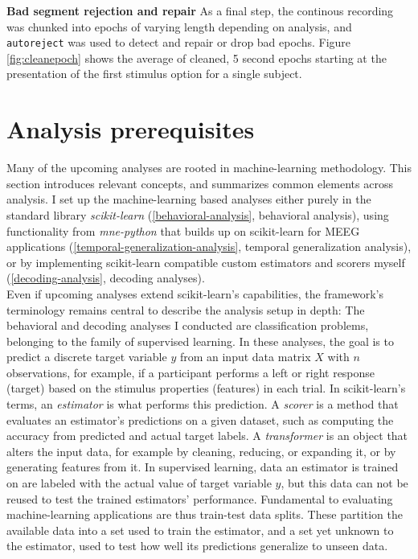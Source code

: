 \textbf{Bad segment rejection and repair} As a final step, the continous recording was chunked into epochs of varying length depending on analysis, and \texttt{autoreject} was used to detect and repair or drop bad epochs.
Figure \ref{fig:cleanepoch} shows the average of cleaned, 5 second epochs starting at the presentation of the first stimulus option for a single subject.



\section{Analysis prerequisites}
\label{decoding}

Many of the upcoming analyses are rooted in machine-learning methodology.
This section introduces relevant concepts, and summarizes common elements across analysis.
I set up the machine-learning based analyses either purely in the standard library \textit{scikit-learn} (\ref{behavioral-analysis}, behavioral analysis), using functionality from \textit{mne-python} that builds up on scikit-learn for MEEG applications (\ref{temporal-generalization-analysis}, temporal generalization analysis), or by implementing scikit-learn compatible custom estimators and scorers myself (\ref{decoding-analysis}, decoding analyses).\\
Even if upcoming analyses extend scikit-learn's capabilities, the framework's terminology remains central to describe the analysis setup in depth:
The behavioral and decoding analyses I conducted are classification problems, belonging to the family of supervised learning.
In these analyses, the goal is to predict a discrete target variable $y$ from an input data matrix $X$ with $n$ observations, for example, if a participant performs a left or right response (target) based on the stimulus properties (features) in each trial.
In scikit-learn's terms, an \textit{estimator} is what performs this prediction.
A \textit{scorer} is a method that evaluates an estimator's predictions on a given dataset, such as computing the accuracy from predicted and actual target labels.
A \textit{transformer} is an object that alters the input data, for example by cleaning, reducing, or expanding it, or by generating features from it.
In supervised learning, data an estimator is trained on are labeled with the actual value of target variable $y$, but this data can not be reused to test the trained estimators' performance.
Fundamental to evaluating machine-learning applications are thus train-test data splits.
These partition the available data into a set used to train the estimator, and a set yet unknown to the estimator, used to test how well its predictions generalize to unseen data.
